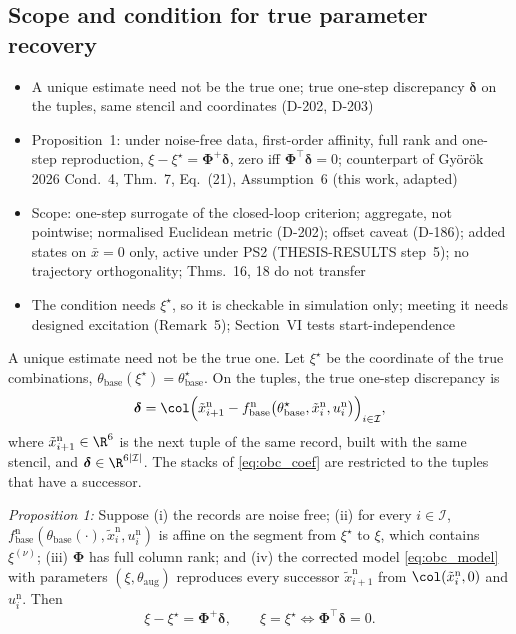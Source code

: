 \subsection{Scope and condition for true parameter recovery}\label{sec:obc_scope}
\ifdraft
\begin{itemize}
\item A unique estimate need not be the true one; true one-step discrepancy $\boldsymbol\delta$ on the tuples, same stencil and coordinates (D-202, D-203)
\item Proposition~1: under noise-free data, first-order affinity, full rank and one-step reproduction, $\xi-\xi^\star=\boldsymbol\Phi^{+}\boldsymbol\delta$, zero iff $\boldsymbol\Phi^\top\boldsymbol\delta=0$; counterpart of Gy\"or\"ok 2026 Cond.~4, Thm.~7, Eq.~(21), Assumption~6 (this work, adapted)
\item Scope: one-step surrogate of the closed-loop criterion; aggregate, not pointwise; normalised Euclidean metric (D-202); offset caveat (D-186); added states on $\bar x=0$ only, active under PS2 (THESIS-RESULTS step~5); no trajectory orthogonality; Thms.~16, 18 do not transfer
\item The condition needs $\xi^\star$, so it is checkable in simulation only; meeting it needs designed excitation (Remark~5); Section~VI tests start-independence
\end{itemize}
\fi

A unique estimate need not be the true one.
Let $\xi^\star$ be the coordinate of the true combinations,
$\theta_{\mathrm{base}}(\xi^\star)=\theta^\star_{\mathrm{base}}$.
On the tuples, the true one-step discrepancy is
\begin{equation}
 \boldsymbol\delta=\col\Bigl(\tilde x^{\mathrm n}_{i+1}
 -f^{\mathrm n}_{\mathrm{base}}\bigl(\theta^\star_{\mathrm{base}},
 \tilde x^{\mathrm n}_i,u^{\mathrm n}_i\bigr)\Bigr)_{i\in\mathcal I},
 \label{eq:obc_delta}
\end{equation}
where $\tilde x^{\mathrm n}_{i+1}\in\R^6$ is the next tuple of the same record,
built with the same stencil, and $\boldsymbol\delta\in\R^{6|\mathcal I|}$.
The stacks of \eqref{eq:obc_coef} are restricted to the tuples that have a
successor.

\textit{Proposition 1:} Suppose (i) the records are noise free; (ii) for every
$i\in\mathcal I$, $f^{\mathrm n}_{\mathrm{base}}(\theta_{\mathrm{base}}(\cdot),
\tilde x^{\mathrm n}_i,u^{\mathrm n}_i)$ is affine on the segment from
$\xi^\star$ to $\xi$, which contains $\xi^{(\nu)}$; (iii)
$\boldsymbol\Phi$ has full column rank; and (iv) the corrected model
\eqref{eq:obc_model} with parameters $(\xi,\theta_{\mathrm{aug}})$
reproduces every successor $\tilde x^{\mathrm n}_{i+1}$ from
$\col(\tilde x^{\mathrm n}_i,0)$ and $u^{\mathrm n}_i$.
Then
\begin{equation}
 \xi-\xi^\star=\boldsymbol\Phi^{+}\boldsymbol\delta,
 \qquad
 \xi=\xi^\star\iff\boldsymbol\Phi^\top\boldsymbol\delta=0.
 \label{eq:obc_bias}
\end{equation}

